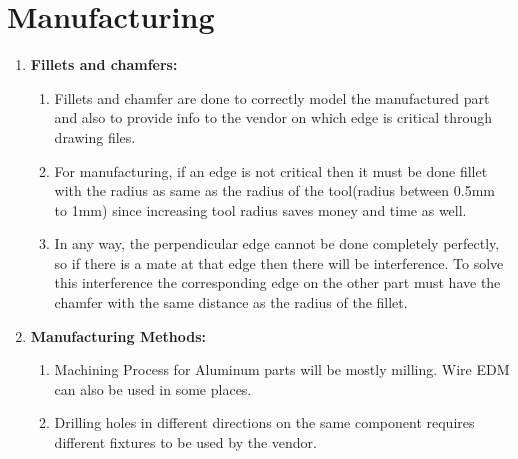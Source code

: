 \documentclass[../../main.tex]{subfiles}
\begin{document}
\section{Manufacturing}
\begin{enumerate}
    \item \textbf{Fillets and chamfers:}
    \begin{enumerate}
        \item Fillets and chamfer are done to correctly model the manufactured part and also to provide info to the vendor on which edge is critical through drawing files.
        \item For manufacturing, if an edge is not critical then it must be done fillet with the radius as same as the radius of the tool(radius between 0.5mm to 1mm) since increasing tool radius saves money and time as well. 
        \item In any way, the perpendicular edge cannot be done completely perfectly, so if there is a mate at that edge then there will be interference. To solve this interference the corresponding edge on the other part must have the chamfer with the same distance as the radius of the fillet. 
    \end{enumerate}
    \item \textbf{Manufacturing Methods:}
    \begin{enumerate}
        \item Machining Process for Aluminum parts will be mostly milling. Wire EDM can also be used in some places.
        \item Drilling holes in different directions on the same component requires different fixtures to be used by the vendor. 
    \end{enumerate}
\end{enumerate}
\end{document}
